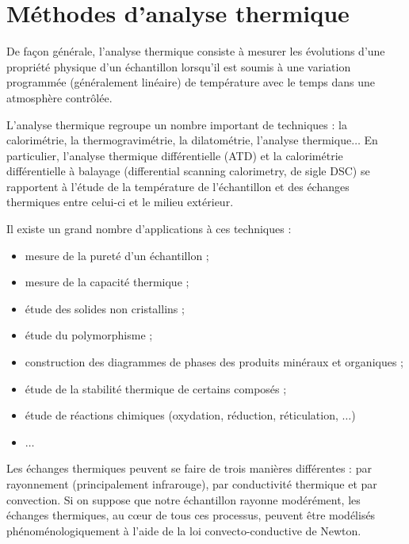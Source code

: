 \documentclass[a4paper]{book}
\begin{document}
\tableofcontents


%

\appendix

\chapter{Méthodes d'analyse thermique}

De façon générale, l'analyse thermique consiste à mesurer les
évolutions d'une propriété physique d'un échantillon lorsqu'il est soumis à une variation programmée (généralement linéaire) de température avec le temps dans une atmosphère contrôlée.

L'analyse thermique regroupe un nombre important de techniques : la calorimétrie, la thermogravimétrie, la dilatométrie, l'analyse thermique$\ldots$ En particulier, l'analyse thermique différentielle (ATD) et la calorimétrie différentielle à balayage (differential scanning calorimetry, de sigle DSC) se rapportent à l'étude de la température de l'échantillon et des échanges thermiques entre celui-ci et le milieu extérieur.

Il existe un grand nombre d'applications à ces techniques : 
\begin{itemize}
\item mesure de la pureté d'un échantillon ; 
\item mesure de la capacité thermique ;
\item étude des solides non cristallins ;
\item étude du polymorphisme ;
\item construction des diagrammes de phases des produits minéraux et organiques ;
\item étude de la stabilité thermique de certains composés ;
\item étude de réactions chimiques (oxydation, réduction, réticulation, $\ldots$)
\item $\ldots$
\end{itemize}

Les échanges thermiques peuvent se faire de trois manières différentes : par rayonnement (principalement infrarouge), par conductivité thermique et par convection. Si on suppose que notre échantillon rayonne modérément, les échanges thermiques, au c{\oe}ur de tous ces processus, peuvent être modélisés phénoménologiquement à l'aide de la loi convecto-conductive de Newton. 
\end{document}
